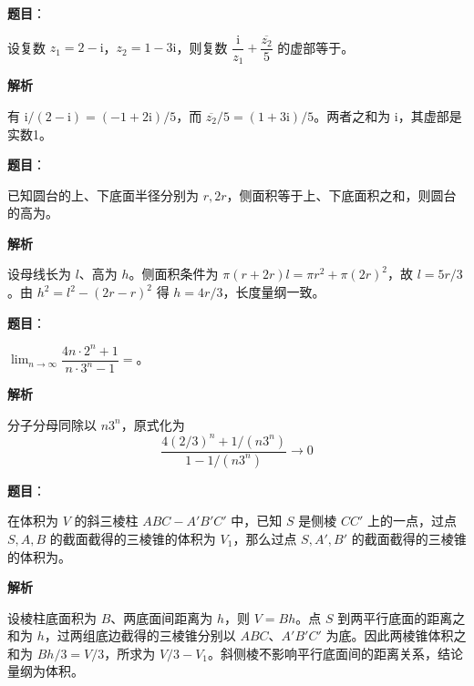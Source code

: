 \begin{answer}

\textbf{题目}：

设复数 $z_1=2-\mathrm i$，$z_2=1-3\mathrm i$，则复数 $\dfrac{\mathrm i}{z_1}+\dfrac{\overline{z_2}}5$ 的虚部等于\underline{\hspace{6em}}。

\textbf{解析}

有 $\mathrm i/(2-\mathrm i)=(-1+2\mathrm i)/5$，而 $\overline{z_2}/5=(1+3\mathrm i)/5$。两者之和为 $\mathrm i$，其虚部是实数1。


\end{answer}
\begin{answer}

\textbf{题目}：

已知圆台的上、下底面半径分别为 $r,2r$，侧面积等于上、下底面积之和，则圆台的高为\underline{\hspace{6em}}。

\textbf{解析}

设母线长为 $l$、高为 $h$。侧面积条件为 $\pi(r+2r)l=\pi r^2+\pi(2r)^2$，故 $l=5r/3$。由 $h^2=l^2-(2r-r)^2$ 得 $h=4r/3$，长度量纲一致。


\end{answer}
\begin{answer}

\textbf{题目}：

$\displaystyle\lim_{n\to\infty}\dfrac{4n\cdot2^n+1}{n\cdot3^n-1}=$\underline{\hspace{6em}}。

\textbf{解析}

分子分母同除以 $n3^n$，原式化为
\nopagebreak[4]
\[
\frac{4(2/3)^n+1/(n3^n)}{1-1/(n3^n)}\longrightarrow0
\]


\end{answer}
\begin{answer}

\textbf{题目}：

在体积为 $V$ 的斜三棱柱 $ABC-A'B'C'$ 中，已知 $S$ 是侧棱 $CC'$ 上的一点，过点 $S,A,B$ 的截面截得的三棱锥的体积为 $V_1$，那么过点 $S,A',B'$ 的截面截得的三棱锥的体积为\underline{\hspace{6em}}。

\textbf{解析}

设棱柱底面积为 $B$、两底面间距离为 $h$，则 $V=Bh$。点 $S$ 到两平行底面的距离之和为 $h$，过两组底边截得的三棱锥分别以 $ABC$、$A'B'C'$ 为底。因此两棱锥体积之和为 $Bh/3=V/3$，所求为 $V/3-V_1$。斜侧棱不影响平行底面间的距离关系，结论量纲为体积。


\end{answer}
